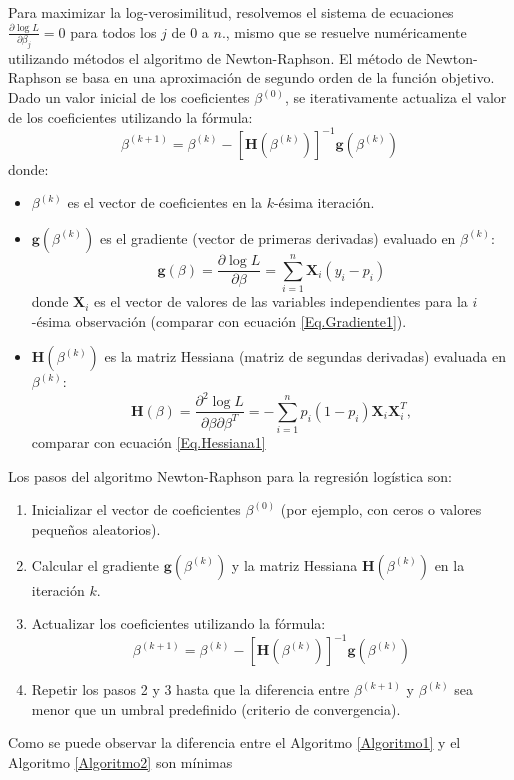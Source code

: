 Para maximizar la log-verosimilitud, resolvemos el sistema de ecuaciones $\frac{\partial \log L}{\partial \beta_j} = 0$ para todos los $j$ de 0 a $n$., mismo que se resuelve numéricamente utilizando métodos el algoritmo de Newton-Raphson. El método de Newton-Raphson se basa en una aproximación de segundo orden de la función objetivo. Dado un valor inicial de los coeficientes $\beta^{(0)}$, se iterativamente actualiza el valor de los coeficientes utilizando la fórmula:
\begin{equation}\label{Eq.Criterio1.5}
\beta^{(k+1)} = \beta^{(k)} - \left[ \mathbf{H}(\beta^{(k)}) \right]^{-1} \mathbf{g}(\beta^{(k)})
\end{equation}
donde:
\begin{itemize}
    \item $\beta^{(k)}$ es el vector de coeficientes en la $k$-ésima iteración.
    \item $\mathbf{g}(\beta^{(k)})$ es el gradiente (vector de primeras derivadas) evaluado en $\beta^{(k)}$:
\begin{equation}\label{Eq.Gradiente2}
\mathbf{g}(\beta) = \frac{\partial \log L}{\partial \beta} = \sum_{i=1}^{n} \mathbf{X}_i (y_i - p_i)
\end{equation}
donde $\mathbf{X}_i$ es el vector de valores de las variables independientes para la $i$-ésima observación (comparar con ecuaci\'on \ref{Eq.Gradiente1}).

    \item $\mathbf{H}(\beta^{(k)})$ es la matriz Hessiana (matriz de segundas derivadas) evaluada en $\beta^{(k)}$:
\begin{equation}\label{Eq.Hessiana2}
\mathbf{H}(\beta) = \frac{\partial^2 \log L}{\partial \beta \partial \beta^T} = -\sum_{i=1}^{n} p_i (1 - p_i) \mathbf{X}_i \mathbf{X}_i^T,
\end{equation}
comparar con ecuaci\'on \ref{Eq.Hessiana1}
\end{itemize}

\begin{Algthm} \label{Algoritmo2}
Los pasos del algoritmo Newton-Raphson para la regresión logística son:
\begin{enumerate}
    \item Inicializar el vector de coeficientes $\beta^{(0)}$ (por ejemplo, con ceros o valores pequeños aleatorios).
    \item Calcular el gradiente $\mathbf{g}(\beta^{(k)})$ y la matriz Hessiana $\mathbf{H}(\beta^{(k)})$ en la iteración $k$.
    \item Actualizar los coeficientes utilizando la fórmula:
    \begin{equation}\label{Eq.Criterio2}
    \beta^{(k+1)} = \beta^{(k)} - \left[ \mathbf{H}(\beta^{(k)}) \right]^{-1} \mathbf{g}(\beta^{(k)})
    \end{equation}
    \item Repetir los pasos 2 y 3 hasta que la diferencia entre $\beta^{(k+1)}$ y $\beta^{(k)}$ sea menor que un umbral predefinido (criterio de convergencia).
\end{enumerate}
\end{Algthm}
Como se puede observar la diferencia entre el Algoritmo \ref{Algoritmo1} y el Algoritmo \ref{Algoritmo2} son m\'inimas

